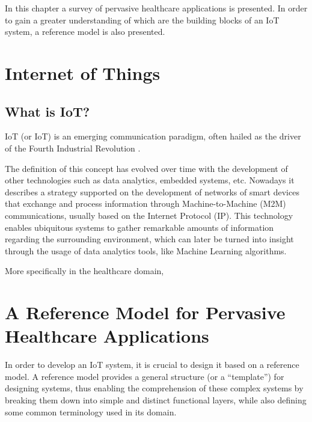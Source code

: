 In this chapter a survey of pervasive healthcare applications is presented. In order to gain a greater understanding of which are the building blocks of an \acf{IoT} system, a reference model is also presented.

\section{Internet of Things}

\subsection{What is IoT?}

\acl{IoT} (or \acs{IoT}) is an emerging communication paradigm, often hailed as the driver of the Fourth Industrial Revolution \cite{Aceto2020}. \bigskip

The definition of this concept has evolved over time with the development of other technologies such as data analytics, embedded systems, etc. Nowadays it describes a strategy supported on the development of networks of smart devices that exchange and process information through Machine-to-Machine (M2M) communications, usually based on the Internet Protocol (IP). This technology enables ubiquitous systems to gather remarkable amounts of information regarding the surrounding environment, which can later be turned into insight through the usage of data analytics tools, like Machine Learning algorithms. \bigskip

More specifically in the healthcare domain, 


\section{A Reference Model for Pervasive Healthcare Applications}

In order to develop an IoT system, it is crucial to design it based on a reference model. A reference model provides a general structure (or a ``template'') for designing systems, thus enabling the comprehension of these complex systems by breaking them down into simple and distinct functional layers, while also defining some common terminology used in its domain.\bigskip


